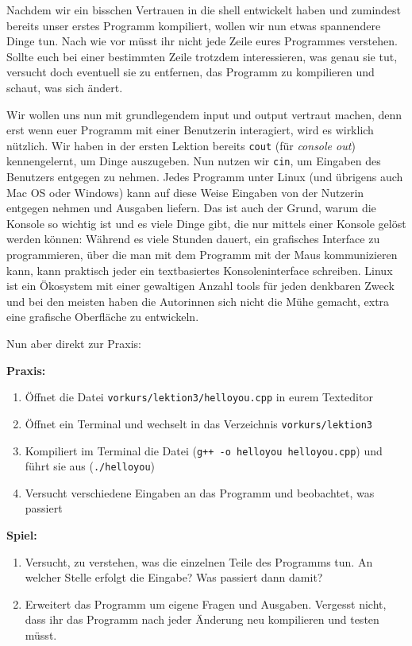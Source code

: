 
Nachdem wir ein bisschen Vertrauen in die shell entwickelt haben und zumindest
bereits unser erstes Programm kompiliert, wollen wir nun etwas spannendere
Dinge tun. Nach wie vor müsst ihr nicht jede Zeile eures Programmes verstehen.
Sollte euch bei einer bestimmten Zeile trotzdem interessieren, was genau sie
tut, versucht doch eventuell sie zu entfernen, das Programm zu kompilieren und
schaut, was sich ändert.

Wir wollen uns nun mit grundlegendem input und output vertraut machen, denn
erst wenn euer Programm mit einer Benutzerin interagiert, wird es wirklich
nützlich. Wir haben in der ersten Lektion bereits \texttt{cout} (für
\emph{console out}) kennengelernt, um Dinge auszugeben. Nun nutzen wir
\texttt{cin}, um Eingaben des Benutzers entgegen zu nehmen. Jedes Programm
unter Linux (und übrigens auch Mac OS oder Windows) kann auf diese Weise
Eingaben von der Nutzerin entgegen nehmen und Ausgaben liefern. Das ist auch
der Grund, warum die Konsole so wichtig ist und es viele Dinge gibt, die nur
mittels einer Konsole gelöst werden können: Während es viele Stunden dauert,
ein grafisches Interface zu programmieren, über die man mit dem Programm mit
der Maus kommunizieren kann, kann praktisch jeder ein textbasiertes
Konsoleninterface schreiben. Linux ist ein Ökosystem mit einer gewaltigen
Anzahl tools für jeden denkbaren Zweck und bei den meisten haben die Autorinnen
sich nicht die Mühe gemacht, extra eine grafische Oberfläche zu entwickeln.

Nun aber direkt zur Praxis:

\textbf{Praxis:}
\begin{enumerate}
    \item Öffnet die Datei \texttt{vorkurs/lektion3/helloyou.cpp} in eurem Texteditor
    \item Öffnet ein Terminal und wechselt in das Verzeichnis \texttt{vorkurs/lektion3}
    \item Kompiliert im Terminal die Datei (\texttt{g++ -o helloyou
        helloyou.cpp}) und führt sie aus (\texttt{./helloyou})
    \item Versucht verschiedene Eingaben an das Programm und beobachtet, was passiert
\end{enumerate}


\textbf{Spiel:}

\begin{enumerate}
    \item Versucht, zu verstehen, was die einzelnen Teile des Programms tun. An
        welcher Stelle erfolgt die Eingabe? Was passiert dann damit?
    \item Erweitert das Programm um eigene Fragen und Ausgaben. Vergesst nicht,
        dass ihr das Programm nach jeder Änderung neu kompilieren und testen
        müsst.
\end{enumerate}
